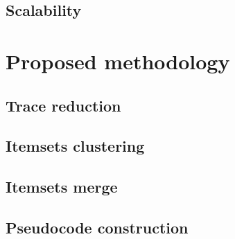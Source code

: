 \subsection{Scalability}\label{ss:scalability}

\section{Proposed methodology}

\subsection{Trace reduction}

\subsection{Itemsets clustering}

\subsection{Itemsets merge}

\subsection{Pseudocode construction}
